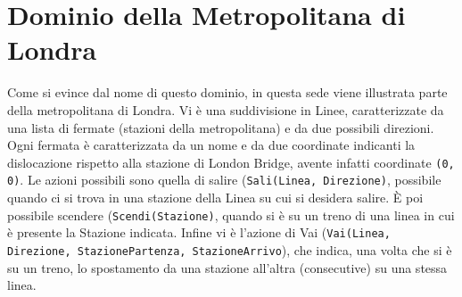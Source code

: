 \section{Dominio della Metropolitana di Londra} \label{sec:tube}
Come si evince dal nome di questo dominio, in questa sede viene illustrata parte della metropolitana di Londra. Vi è una suddivisione in Linee, caratterizzate da una lista di fermate (stazioni della metropolitana) e da due possibili direzioni. Ogni fermata è caratterizzata da un nome e da due coordinate indicanti la dislocazione rispetto alla stazione di London Bridge, avente infatti coordinate \texttt{(0, 0)}.
Le azioni possibili sono quella di salire (\texttt{Sali(Linea, Direzione)}, possibile quando ci si trova in una stazione della Linea su cui si desidera salire. È poi possibile scendere (\texttt{Scendi(Stazione)}, quando si è su un treno di una linea in cui è presente la Stazione indicata. Infine vi è l'azione di Vai (\texttt{Vai(Linea, Direzione, StazionePartenza, StazioneArrivo}), che indica, una volta che si è su un treno, lo spostamento da una stazione all'altra (consecutive) su una stessa linea.
